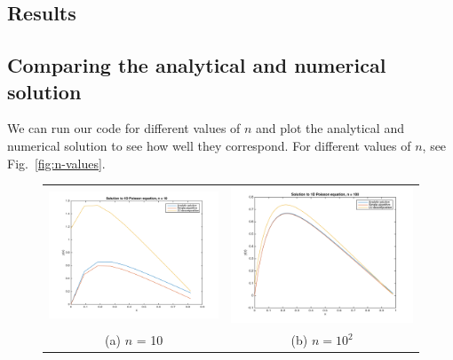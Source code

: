 \documentclass{article}
\begin{document}
\begin{multicols}{2}
\section{Results}    \label{sec:analysis}

\subsection{Comparing the analytical and numerical solution}
We can run our code for different values of $n$ and plot the analytical and numerical solution to see how well they correspond. For different values of $n$, see Fig.~\ref{fig:n-values}.

\begin{figure}
\begin{center}
\begin{tabular}{cc}
  	\includegraphics[width=90mm]{../build-Project1-Desktop_Qt_5_5_0_clang_64bit-Debug/Plot_n10.png} 	
	& \includegraphics[width=90mm]{../build-Project1-Desktop_Qt_5_5_0_clang_64bit-Debug/Plot_n100.png} \\
	
	(a) $n$ = 10 								& (b) $n = 10^2$ \\[6pt]
	

\end{tabular}
\end{center}
\end{figure}
\end{multicols}
\end{document}
